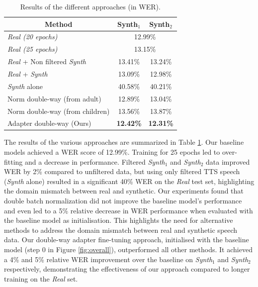 \begin{table}[t]
\centering
\begin{tabular}{ccc}
\hline
 Method & Synth$_1$ & Synth$_2$  \\ \hline
\multicolumn{1}{l}{\textit{Real (20 epochs)}} & \multicolumn{2}{c}{12.99\%}\\ 
\multicolumn{1}{l}{\textit{Real (25 epochs)}} & \multicolumn{2}{c}{13.15\%}\\ \hline
\multicolumn{1}{l}{\textit{Real} + Non filtered \textit{Synth}}  &   13.41\%  & 13.24\% \\ 
\multicolumn{1}{l}{\textit{Real} + \textit{Synth} \cite{wang2021towards}} & 13.09\% & 12.98\% \\
\multicolumn{1}{l}{\textit{Synth} alone}    & 40.58\%  & 40.21\%  \\ \hline
\multicolumn{1}{l}{Norm double-way (from adult)} & 12.89\% & 13.04\% \\ 
\multicolumn{1}{l}{Norm double-way (from children)} & 13.56\% & 13.87\% \\ \hline
\multicolumn{1}{l}{Adapter double-way (Ours)} &\textbf{ 12.42\%} & \textbf{12.31\%} \\ \hline
\end{tabular}

\caption{Results of the different approaches (in WER).}
\label{tab:res}
\end{table}

The results of the various approaches are summarized in Table \ref{tab:res}. Our baseline models achieved a WER score of 12.99\%. Training for 25 epochs led to over-fitting and a decrease in performance.
Filtered \textit{Synth$_1$} and \textit{Synth$_2$} data improved WER by 2\% compared to unfiltered data, but using only filtered TTS speech (\textit{Synth} alone) resulted in a significant 40\% WER on the \textit{Real} test set, highlighting the domain mismatch between real and synthetic.
Our experiments found that double batch normalization did not improve the baseline model's performance and even led to a 5\% relative decrease in WER  performance when evaluated with the baseline model as initialisation. This highlights the need for alternative methods to address the domain mismatch between real and synthetic speech data.
Our double-way adapter fine-tuning approach, initialised with the baseline model (step 0 in Figure \ref{fig:overall}), outperformed all other methods. It achieved a 4\% and 5\% relative WER improvement over the baseline on \textit{Synth$_1$} and \textit{Synth$_2$} respectively, demonstrating the effectiveness of our approach compared to longer training on the \textit{Real} set.

